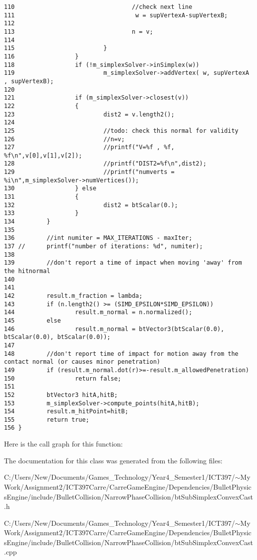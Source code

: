 \begin{Code}
\begin{verbatim}
110                                 //check next line
111                                  w = supVertexA-supVertexB;
112                                 
113                                 n = v;
114                                 
115                         }
116                 } 
118                 if (!m_simplexSolver->inSimplex(w))
119                         m_simplexSolver->addVertex( w, supVertexA , supVertexB);
120 
121                 if (m_simplexSolver->closest(v))
122                 {
123                         dist2 = v.length2();
124                         
125                         //todo: check this normal for validity
126                         //n=v;
127                         //printf("V=%f , %f, %f\n",v[0],v[1],v[2]);
128                         //printf("DIST2=%f\n",dist2);
129                         //printf("numverts = %i\n",m_simplexSolver->numVertices());
130                 } else
131                 {
132                         dist2 = btScalar(0.);
133                 } 
134         }
135 
136         //int numiter = MAX_ITERATIONS - maxIter;
137 //      printf("number of iterations: %d", numiter);
138         
139         //don't report a time of impact when moving 'away' from the hitnormal
140         
141 
142         result.m_fraction = lambda;
143         if (n.length2() >= (SIMD_EPSILON*SIMD_EPSILON))
144                 result.m_normal = n.normalized();
145         else
146                 result.m_normal = btVector3(btScalar(0.0), btScalar(0.0), btScalar(0.0));
147 
148         //don't report time of impact for motion away from the contact normal (or causes minor penetration)
149         if (result.m_normal.dot(r)>=-result.m_allowedPenetration)
150                 return false;
151 
152         btVector3 hitA,hitB;
153         m_simplexSolver->compute_points(hitA,hitB);
154         result.m_hitPoint=hitB;
155         return true;
156 }
\end{verbatim}
\end{Code}




Here is the call graph for this function:

The documentation for this class was generated from the following files:\begin{CompactItemize}
\item 
C:/Users/New/Documents/Games\_\-Technology/Year4\_\-Semester1/ICT397/$\sim$My Work/Assignment2/ICT397Carre/CarreGameEngine/Dependencies/BulletPhysicsEngine/include/BulletCollision/NarrowPhaseCollision/btSubSimplexConvexCast.h\item 
C:/Users/New/Documents/Games\_\-Technology/Year4\_\-Semester1/ICT397/$\sim$My Work/Assignment2/ICT397Carre/CarreGameEngine/Dependencies/BulletPhysicsEngine/include/BulletCollision/NarrowPhaseCollision/btSubSimplexConvexCast.cpp\end{CompactItemize}
